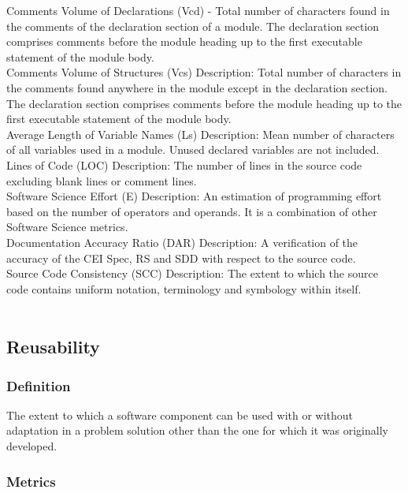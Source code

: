 \documentclass{article}
\begin{document}
Comments Volume of Declarations (Vcd) -  Total number of characters found in the comments of the declaration section of a module.  The declaration section comprises comments before the module heading up to the first executable statement of the module body. \\

 Comments Volume of Structures (Vcs) Description:    Total number of characters in the comments found anywhere in the module except in  the  declaration  section.    The  declaration  section  comprises  comments  before  the module heading up to the first executable statement of the module body.\\
 
 Average Length of Variable Names (Ls) Description:     Mean  number  of  characters  of  all  variables  used  in  a  module.    Unused  declared  variables are not included. \\
 
  Lines of  Code (LOC) Description: The number of lines in the source code excluding blank lines or comment lines.\\
  
  Software Science Effort (E) Description:    An  estimation  of  programming  effort  based  on  the  number  of  operators  and  operands.  It is a combination of other Software Science metrics.\\
  
  Documentation Accuracy Ratio (DAR) Description:     A  verification  of  the  accuracy  of  the  CEI Spec, RS and SDD with respect to the source code.\\
  
  Source Code Consistency (SCC) Description:     The  extent  to  which  the  source  code  contains uniform notation, terminology and symbology within itself. \\
  
~\newpage

\subsection{Reusability}
\subsubsection{Definition}
The extent to which a software component can be used with or without adaptation in a problem solution other than the one for which it was originally developed.

\subsubsection{Metrics}
\end{document}
